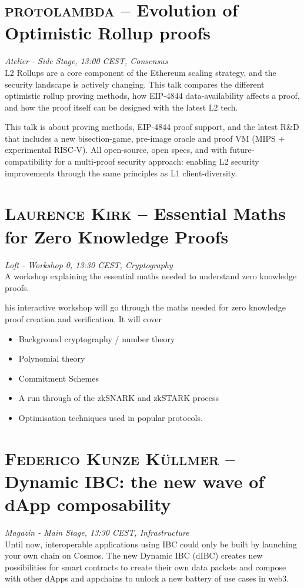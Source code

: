 \section {\textsc{protolambda} -- Evolution of Optimistic Rollup proofs
} \noindent \textit {Atelier - Side Stage, 13:00 CEST, Consensus
}\\[1em] L2 Rollups are a core component of the Ethereum scaling strategy, and the security landscape is actively changing. This talk compares the different optimistic rollup proving methods, how EIP-4844 data-availability affects a proof, and how the proof itself can be designed with the latest L2 tech.
\par This talk is about proving methods, EIP-4844 proof support, and the latest R\&D
 that includes a new bisection-game, pre-image oracle and proof VM (MIPS + experimental RISC-V). All open-source, open specs, and with future-compatibility for a multi-proof security approach: enabling L2 security improvements through the same principles as L1 client-diversity.
\clearpage
\section {\textsc{Laurence Kirk} -- Essential Maths for Zero Knowledge Proofs
} \noindent \textit {Loft - Workshop 0, 13:30 CEST, Cryptography
}\\[1em] A workshop explaining the essential maths needed to understand zero knowledge proofs.
\par his interactive workshop will go through the maths needed for zero knowledge proof creation and verification.
It will cover
\begin{itemize}
\item Background cryptography / number theory
\item Polynomial theory
\item Commitment Schemes
\item A run through of the zkSNARK and zkSTARK process
\item Optimisation techniques used in popular protocols.
\end{itemize}
\clearpage
\section {\textsc{Federico Kunze Küllmer} -- Dynamic IBC: the new wave of dApp composability
} \noindent \textit {Magazin - Main Stage, 13:30 CEST, Infrastructure
}\\[1em] Until now, interoperable applications using IBC could only be built by launching your own chain on Cosmos. The new Dynamic IBC (dIBC) creates new possibilities for smart contracts to create their own data packets and compose with other dApps and appchains to unlock a new battery of use cases in web3.
\par \clearpage

